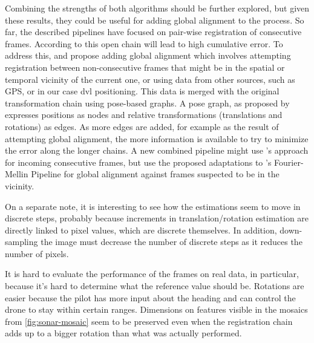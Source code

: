 Combining the strengths of both algorithms should be further explored, but given these results, they could be useful for adding global alignment to the process. So far, the described pipelines have focused on pair-wise registration of consecutive frames. According to \citeauthor{Hurtos2015}\cite{Hurtos2015} this open chain will lead to high cumulative error. To address this, \citeauthor{Hurtos2015}\cite{Hurtos2015} and \citeauthor{Das2021}\cite{Das2021} propose adding global alignment which involves attempting registration between non-consecutive frames that might be in the spatial or temporal vicinity of the current one, or using data from other sources, such as GPS, or in our case \acrshort{dvl} positioning. This data is merged with the original transformation chain using pose-based graphs. A pose graph, as proposed by \citeauthor{Kummerle2011}\cite{Kummerle2011} expresses positions as nodes and relative transformations (translations and rotations) as edges. As more edges are added, for example as the result of attempting global alignment, the more information is available to try to minimize the error along the longer chains. A new combined pipeline might use \citeauthor{Hurtos2015}'s approach for incoming consecutive frames, but use the proposed adaptations to \citeauthor{Reddy1996}'s Fourier-Mellin Pipeline for global alignment against frames suspected to be in the vicinity.

On a separate note, it is interesting to see how the estimations seem to move in discrete steps, probably because increments in translation/rotation estimation are directly linked to pixel values, which are discrete themselves. In addition, down-sampling the image must decrease the number of discrete steps as it reduces the number of pixels. 

It is hard to evaluate the performance of the frames on real data, in particular, because it's hard to determine what the reference value should be. Rotations are easier because the pilot has more input about the heading and can control the drone to stay within certain ranges. Dimensions on features visible in the mosaics from \autoref{fig:sonar-mosaic} seem to be preserved even when the registration chain adds up to a bigger rotation than what was actually performed.